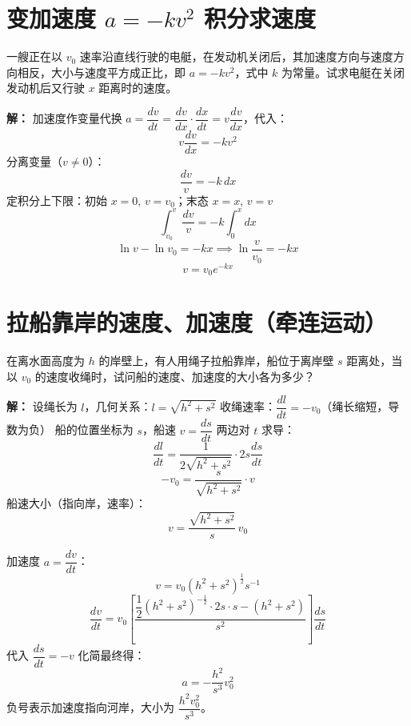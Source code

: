 \section{变加速度 $a=-kv^2$ 积分求速度}
一艘正在以 $v_0$ 速率沿直线行驶的电艇，在发动机关闭后，其加速度方向与速度方向相反，大小与速度平方成正比，即 $a=-kv^2$，式中 $k$ 为常量。试求电艇在关闭发动机后又行驶 $x$ 距离时的速度。

\noindent\textbf{解：}
加速度作变量代换 $a=\dfrac{dv}{dt}=\dfrac{dv}{dx}\cdot\dfrac{dx}{dt}=v\dfrac{dv}{dx}$，代入：
\[
v\frac{dv}{dx} = -kv^2
\]
分离变量（$v\neq0$）：
\[
\frac{dv}{v} = -k\,dx
\]
定积分上下限：初始 $x=0,\,v=v_0$；末态 $x=x,\,v=v$
\[
\int_{v_0}^{v} \frac{dv}{v} = -k\int_{0}^{x}dx
\]
\[
\ln v - \ln v_0 = -kx \implies \ln\frac{v}{v_0}=-kx
\]
\[
\boxed{v = v_0 e^{-kx}}
\]


\section{拉船靠岸的速度、加速度（牵连运动）}
\begin{center}
\end{center}
在离水面高度为 $h$ 的岸壁上，有人用绳子拉船靠岸，船位于离岸壁 $s$ 距离处，当以 $v_0$ 的速度收绳时，试问船的速度、加速度的大小各为多少？

\noindent\textbf{解：}
设绳长为 $l$，几何关系：$l=\sqrt{h^2+s^2}$
收绳速率：$\dfrac{dl}{dt}=-v_0$（绳长缩短，导数为负）
船的位置坐标为 $s$，船速 $v=\dfrac{ds}{dt}$
两边对 $t$ 求导：
\[
\frac{dl}{dt} = \frac{1}{2\sqrt{h^2+s^2}}\cdot 2s \frac{ds}{dt}
\]
\[
-v_0 = \frac{s}{\sqrt{h^2+s^2}} \cdot v
\]
船速大小（指向岸，速率）：
\[
\boxed{v = \frac{\sqrt{h^2+s^2}}{s}\,v_0}
\]

加速度 $a=\dfrac{dv}{dt}$：
\[
v = v_0 (h^2+s^2)^{\frac12} s^{-1}
\]
\[
\frac{dv}{dt} = v_0\left[
\frac{\dfrac12 (h^2+s^2)^{-\frac12}\cdot 2s \cdot s - (h^2+s^2)}{s^2}
\right] \frac{ds}{dt}
\]
代入 $\dfrac{ds}{dt}=-v$ 化简最终得：
\[
\boxed{a = -\frac{h^2}{s^3} v_0^2}
\]
负号表示加速度指向河岸，大小为 $\dfrac{h^2 v_0^2}{s^3}$。


